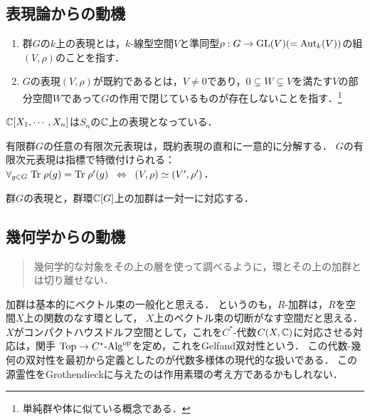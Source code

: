 \documentclass[uplatex,dvipdfmx]{jsreport}
\begin{document}
\subsection{表現論からの動機}

\begin{definition}\mbox{}
    \begin{enumerate}
        \item 群$G$の$k$上の表現とは，$k$-線型空間$V$と準同型$\rho:G\to\mathrm{GL}(V)(=\mathrm{Aut}_k(V))$の組$(V,\rho)$のことを指す．
        \item $G$の表現$(V,\rho)$が既約であるとは，$V\ne 0$であり，$0\subsetneq W\subsetneq V$を満たす$V$の部分空間$W$であって$G$の作用で閉じているものが存在しないことを指す．\footnote{単純群や体に似ている概念である．}
    \end{enumerate}
\end{definition}
\begin{example}
    $\mathbb{C}[X_1,\cdots,X_n]$は$S_n$の$\mathbb{C}$上の表現となっている．
\end{example}

\begin{theorem}
    有限群$G$の任意の有限次元表現は，既約表現の直和に一意的に分解する．
    $G$の有限次元表現は指標で特徴付けられる：$\forall_{g\in G}\;\mathrm{Tr}\;\rho(g)=\mathrm{Tr}\;\rho'(g)\;\;\Leftrightarrow\;\;(V,\rho)\simeq(V',\rho')$．
\end{theorem}

\begin{theorem}
    群$G$の表現と，群環$\mathbb{C}[G]$上の加群は一対一に対応する．
\end{theorem}

\subsection{幾何学からの動機}

\begin{quotation}
    幾何学的な対象をその上の層を使って調べるように，環とその上の加群とは切り離せない．\cite{斎藤毅}
\end{quotation}

加群は基本的にベクトル束の一般化と思える．
というのも，$R$-加群は，$R$を空間$X$上の関数のなす環として，
$X$上のベクトル束の切断がなす空間だと思える．
$X$がコンパクトハウスドルフ空間として，これを$C^*$-代数$C(X,\mathbb{C})$に対応させる対応は，関手
$\mathrm{Top}\to C^*\textrm{-}\mathrm{Alg}^{\mathrm{op}}$を定め，これをGelfand双対性という．
この代数-幾何の双対性を最初から定義としたのが代数多様体の現代的な扱いである．
この源霊性をGrothendieckに与えたのは作用素環の考え方であるかもしれない．
\end{document}
